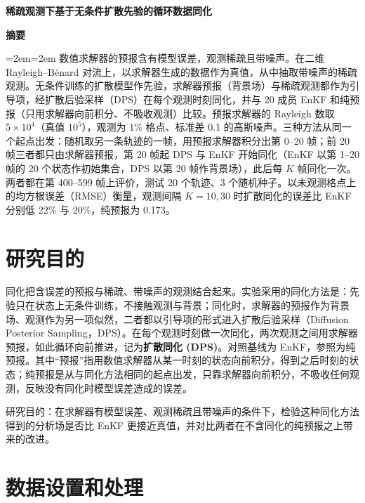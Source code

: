 \documentclass[10.5pt,a4paper]{article}
\begin{document}
\begin{center}{\LARGE\bfseries 稀疏观测下基于无条件扩散先验的循环数据同化\par}\vspace{.4em}{\large Rayleigh--B\'enard 对流实验汇报\par}\end{center}

\begin{center}\textbf{摘\quad 要}\end{center}
\begingroup\small\leftskip=2em\rightskip=2em
数值求解器的预报含有模型误差，观测稀疏且带噪声。在二维 Rayleigh--B\'enard 对流上，以求解器生成的数据作为真值，从中抽取带噪声的稀疏观测。无条件训练的扩散模型作先验，求解器预报（背景场）与稀疏观测都作为引导项，经扩散后验采样（DPS）在每个观测时刻同化，并与 20 成员 EnKF 和纯预报（只用求解器向前积分、不吸收观测）比较。预报求解器的 Rayleigh 数取 $5\times10^4$（真值 $10^5$），观测为 1\% 格点、标准差 0.1 的高斯噪声。三种方法从同一个起点出发：随机取另一条轨迹的一帧，用预报求解器积分出第 0--20 帧；前 20 帧三者都只由求解器预报，第 20 帧起 DPS 与 EnKF 开始同化（EnKF 以第 1--20 帧的 20 个状态作初始集合，DPS 以第 20 帧作背景场），此后每 $K$ 帧同化一次。两者都在第 400--599 帧上评价，测试 20 个轨迹、3 个随机种子。以未观测格点上的均方根误差（RMSE）衡量，观测间隔 $K=10,30$ 时扩散同化的误差比 EnKF 分别低 22\% 与 20\%，纯预报为 0.173。
\endgroup

\section{研究目的}
同化把含误差的预报与稀疏、带噪声的观测结合起来。实验采用的同化方法是：先验只在状态上无条件训练，不接触观测与背景；同化时，求解器的预报作为背景场、观测作为另一项似然，二者都以引导项的形式进入扩散后验采样（Diffusion Posterior Sampling，DPS）。在每个观测时刻做一次同化，两次观测之间用求解器预报，如此循环向前推进，记为\textbf{扩散同化 (DPS)}。对照基线为 EnKF，参照为纯预报。其中``预报''指用数值求解器从某一时刻的状态向前积分，得到之后时刻的状态；纯预报是从与同化方法相同的起点出发，只靠求解器向前积分，不吸收任何观测，反映没有同化时模型误差造成的误差。

研究目的：在求解器有模型误差、观测稀疏且带噪声的条件下，检验这种同化方法得到的分析场是否比 EnKF 更接近真值，并对比两者在不含同化的纯预报之上带来的改进。

\section{数据设置和处理}
\end{document}
